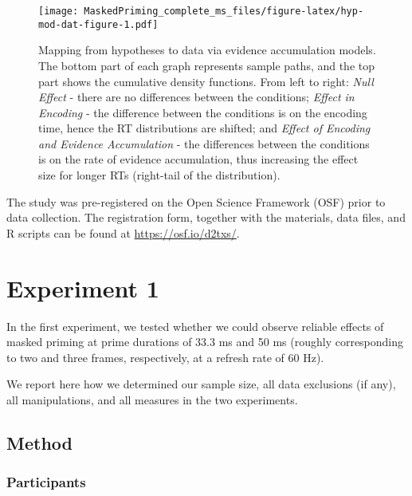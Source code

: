 \documentclass[
  english,
  man,floatsintext]{apa6}
\begin{document}
\begin{figure}
\centering
\texttt{[image: MaskedPriming\_complete\_ms\_files/figure-latex/hyp-mod-dat-figure-1.pdf]}
\caption{\label{fig:hyp-mod-dat-figure}Mapping from hypotheses to data via evidence accumulation models. The bottom part of each graph represents sample paths, and the top part shows the cumulative density functions. From left to right: \emph{Null Effect} - there are no differences between the conditions; \emph{Effect in Encoding} - the difference between the conditions is on the encoding time, hence the RT distributions are shifted; and \emph{Effect of Encoding and Evidence Accumulation} - the differences between the conditions is on the rate of evidence accumulation, thus increasing the effect size for longer RTs (right-tail of the distribution).}
\end{figure}

The study was pre-registered on the Open Science Framework (OSF) prior to data collection. The registration form, together with the materials, data files, and R scripts can be found at \url{https://osf.io/d2txs/}.

\hypertarget{experiment-1}{%
\section{Experiment 1}\label{experiment-1}}

In the first experiment, we tested whether we could observe reliable effects of masked priming at prime durations of 33.3 ms and 50 ms (roughly corresponding to two and three frames, respectively, at a refresh rate of 60 Hz).

We report here how we determined our sample size, all data exclusions (if any), all manipulations, and all measures in the two experiments.

\hypertarget{method}{%
\subsection{Method}\label{method}}

\hypertarget{participants}{%
\subsubsection{Participants}\label{participants}}
\end{document}
